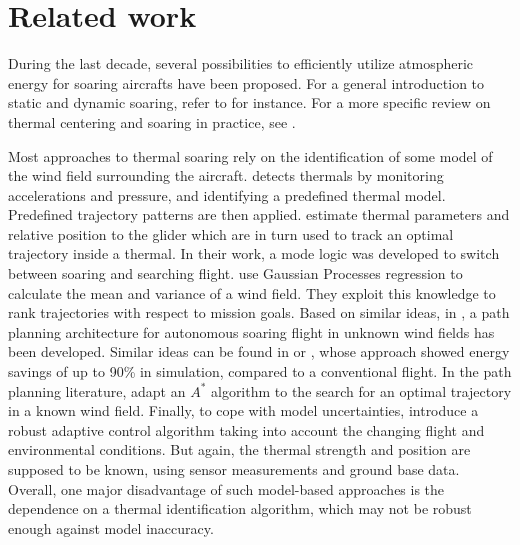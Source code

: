 \documentclass{ifacconf}
\begin{document}
\section{Related work}
\label{sec:relwork}

During the last decade, several possibilities to efficiently utilize atmospheric energy for soaring aircrafts have been proposed. For a general introduction to static and dynamic soaring, refer to \cite{chen1981} for instance. For a more specific review on thermal centering and soaring in practice, see \cite{reichmann}.

Most approaches to thermal soaring rely on the identification of some model of the wind field surrounding the aircraft. \cite{allen05} detects thermals by monitoring accelerations and pressure, and identifying a predefined thermal model. Predefined trajectory patterns are then applied. \cite{allen07} estimate thermal parameters and relative position to the glider which are in turn used to track an optimal trajectory inside a thermal. In their work, a mode logic was developed to switch between soaring and searching flight. \cite{lawrance11} use Gaussian Processes regression to calculate the mean and variance of a wind field. They exploit this knowledge to rank trajectories with respect to mission goals. Based on similar ideas, in \cite{lawrance_phd}, a path planning architecture for autonomous soaring flight in unknown wind fields has been developed. Similar ideas can be found in \cite{bencatel13} or \cite{chen11}, whose approach showed energy savings of up to 90\% in simulation, compared to a conventional flight. In the path planning literature, \cite{chakrabarty} adapt an $A^*$ algorithm to the search for an optimal trajectory in a known wind field. Finally, to cope with model uncertainties, \cite{kahveci} introduce a robust adaptive control algorithm taking into account the changing flight and environmental conditions.
But again, the thermal strength and position are supposed to be known, using sensor measurements and ground base data. Overall, one major disadvantage of such model-based approaches is the dependence on a thermal identification algorithm, which may not be robust enough against model inaccuracy. 

\end{document}
